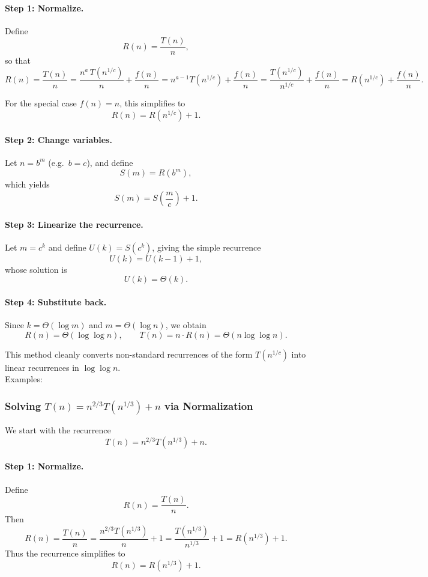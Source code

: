 \documentclass[9pt]{extarticle}
\begin{document}
\paragraph{Step 1: Normalize.}
Define
\[
R(n) = \frac{T(n)}{n},
\]
so that
\[
R(n) = \frac{T(n)}{n}
= \frac{n^{a} \, T(n^{1/c})}{n} + \frac{f(n)}{n}
= n^{a-1} T(n^{1/c}) + \frac{f(n)}{n}
= \frac{T(n^{1/c})}{n^{1/c}} + \frac{f(n)}{n}
= R(n^{1/c}) + \frac{f(n)}{n}.
\]

For the special case $f(n) = n$, this simplifies to
\[
R(n) = R\!\left(n^{1/c}\right) + 1.
\]

\paragraph{Step 2: Change variables.}
Let $n = b^{m}$ (e.g.\ $b = c$), and define
\[
S(m) = R(b^{m}),
\]
which yields
\[
S(m) = S\!\left(\frac{m}{c}\right) + 1.
\]

\paragraph{Step 3: Linearize the recurrence.}
Let $m = c^{k}$ and define $U(k) = S(c^{k})$, giving the simple recurrence
\[
U(k) = U(k-1) + 1,
\]
whose solution is
\[
U(k) = \Theta(k).
\]

\paragraph{Step 4: Substitute back.}
Since $k = \Theta(\log m)$ and $m = \Theta(\log n)$, we obtain
\[
R(n) = \Theta(\log \log n),
\qquad
T(n) = n \cdot R(n) = \Theta\!\left(n \log \log n\right).
\]

This method cleanly converts non-standard recurrences of the form
$T(n^{1/c})$ into linear recurrences in $\log \log n$.\\
Examples:
\subsubsection*{Solving $T(n)=n^{2/3}T(n^{1/3})+n$ via Normalization}

We start with the recurrence
\[
T(n)=n^{2/3}T(n^{1/3})+n.
\]

\paragraph{Step 1: Normalize.}
Define
\[
R(n)=\frac{T(n)}{n}.
\]
Then
\[
R(n)
= \frac{T(n)}{n}
= \frac{n^{2/3}T(n^{1/3})}{n} + 1
= \frac{T(n^{1/3})}{n^{1/3}} + 1
= R(n^{1/3}) + 1.
\]
Thus the recurrence simplifies to
\[
R(n)=R(n^{1/3})+1.
\]
\end{document}
